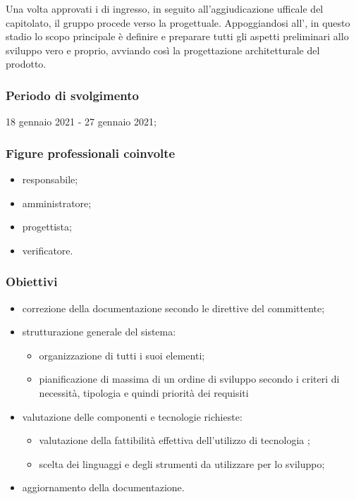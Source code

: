 Una volta approvati i  di ingresso, in seguito all'aggiudicazione ufficale del capitolato, il gruppo procede verso la  progettuale. Appoggiandosi all'\AdR{}, in questo stadio lo scopo principale è definire e preparare tutti gli aspetti preliminari allo sviluppo vero e proprio, avviando così la progettazione architetturale del prodotto.
        
        \subsubsection{Periodo di svolgimento}
        18 gennaio 2021 - 27 gennaio 2021;
        
        \subsubsection{Figure professionali coinvolte}
            \begin{itemize}
                \item responsabile;
                \item amministratore;
                \item progettista;
                \item verificatore.
            \end{itemize}

        \subsubsection{Obiettivi}
        \begin{itemize}
            \item correzione della documentazione secondo le direttive del committente;
            \item strutturazione generale del sistema:
            \begin{itemize}
                \item organizzazione di tutti i suoi elementi;
                \item pianificazione di massima di un ordine di sviluppo secondo i criteri di necessità, tipologia e quindi priorità dei requisiti
            \end{itemize}
            \item valutazione delle componenti e tecnologie richieste:
            \begin{itemize}
                \item valutazione della fattibilità effettiva dell'utilizzo di tecnologia ;
                \item scelta dei linguaggi e degli strumenti da utilizzare per lo sviluppo;
            \end{itemize}
            \item aggiornamento della documentazione.
            
        \end{itemize}